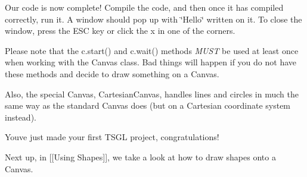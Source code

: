 Our code is now complete! Compile the code, and then once it has compiled correctly, run it. A window should pop up with \char`\"{}\+Hello\char`\"{} written on it. To close the window, press the E\+S\+C key or click the \textquotesingle{}x\textquotesingle{} in one of the corners.

Please note that the c.\+start() and c.\+wait() methods {\itshape M\+U\+S\+T} be used at least once when working with the Canvas class. Bad things will happen if you do not have these methods and decide to draw something on a Canvas.

Also, the special Canvas, Cartesian\+Canvas, handles lines and circles in much the same way as the standard Canvas does (but on a Cartesian coordinate system instead).

You\textquotesingle{}ve just made your first T\+S\+G\+L project, congratulations!

Next up, in \mbox{[}\mbox{[}Using Shapes\mbox{]}\mbox{]}, we take a look at how to draw shapes onto a Canvas. 